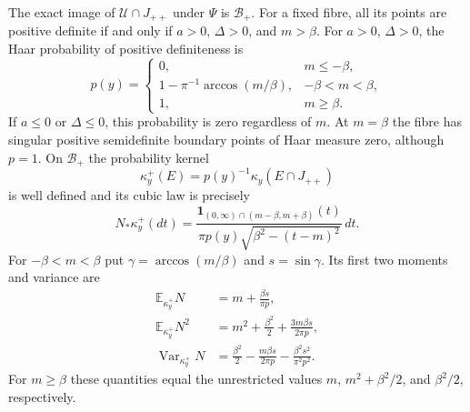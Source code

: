 \begin{theorem}\label{rm:positive-theorem}
The exact image of $\mathcal U\cap J_{++}$ under $\Psi$ is
$\mathcal B_+$. For a fixed fibre, all its points are positive definite
if and only if $a>0$, $\Delta>0$, and $m>\beta$.
For $a>0$, $\Delta>0$, the Haar probability of positive definiteness is
\begin{equation}\label{rm:positive-probability}
 p(y)=
 \begin{cases}
  0,&m\leq-\beta,\\
  1-\pi^{-1}\arccos(m/\beta),&-\beta<m<\beta,\\
  1,&m\geq\beta.
 \end{cases}
\end{equation}
If $a\leq0$ or $\Delta\leq0$, this probability is zero regardless of
$m$. At $m=\beta$ the fibre has singular positive semidefinite boundary points of Haar
measure zero, although $p=1$. On $\mathcal B_+$ the probability kernel
\begin{equation}\label{rm:positive-kernel}
 \kappa_y^+(E)=p(y)^{-1}\kappa_y(E\cap J_{++})
\end{equation}
is well defined and its cubic law is precisely
\begin{equation}\label{rm:positive-law}
 N_*\kappa_y^+(dt)
 =\frac{\mathbf1_{(0,\infty)\cap(m-\beta,m+\beta)}(t)}
       {\pi p(y)\sqrt{\beta^2-(t-m)^2}}\,dt.
\end{equation}
For $-\beta<m<\beta$ put $\gamma=\arccos(m/\beta)$ and
$s=\sin\gamma$. Its first two moments and variance are
\begin{align}
 \mathbb E_{\kappa_y^+}N
   &=m+\frac{\beta s}{\pi p},\label{rm:positive-mean}\\
 \mathbb E_{\kappa_y^+}N^2
   &=m^2+\frac{\beta^2}{2}
                    +\frac{3m\beta s}{2\pi p},\label{rm:positive-second}\\
 \operatorname{Var}_{\kappa_y^+}N
   &=\frac{\beta^2}{2}-\frac{m\beta s}{2\pi p}
                     -\frac{\beta^2s^2}{\pi^2p^2}.
                     \label{rm:positive-variance}
\end{align}
For $m\geq\beta$ these quantities equal the unrestricted values
$m$, $m^2+\beta^2/2$, and $\beta^2/2$, respectively.
\end{theorem}
